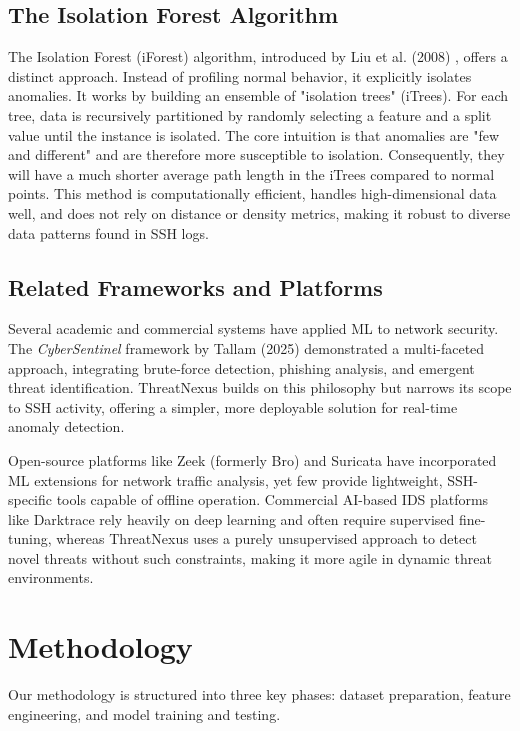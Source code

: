 \documentclass[conference]{IEEEtran}
\begin{document}
\subsection{The Isolation Forest Algorithm}
The Isolation Forest (iForest) algorithm, introduced by Liu et al. (2008) \cite{liu2008isolation}, offers a distinct approach. Instead of profiling normal behavior, it explicitly isolates anomalies. It works by building an ensemble of "isolation trees" (iTrees). For each tree, data is recursively partitioned by randomly selecting a feature and a split value until the instance is isolated. The core intuition is that anomalies are "few and different" and are therefore more susceptible to isolation. Consequently, they will have a much shorter average path length in the iTrees compared to normal points. This method is computationally efficient, handles high-dimensional data well, and does not rely on distance or density metrics, making it robust to diverse data patterns found in SSH logs.

\subsection{Related Frameworks and Platforms}
Several academic and commercial systems have applied ML to network security. The \textit{CyberSentinel} framework by Tallam (2025) \cite{tallam2025cybersentinel} demonstrated a multi-faceted approach, integrating brute-force detection, phishing analysis, and emergent threat identification. ThreatNexus builds on this philosophy but narrows its scope to SSH activity, offering a simpler, more deployable solution for real-time anomaly detection.

Open-source platforms like Zeek (formerly Bro) and Suricata have incorporated ML extensions for network traffic analysis, yet few provide lightweight, SSH-specific tools capable of offline operation. Commercial AI-based IDS platforms like Darktrace rely heavily on deep learning and often require supervised fine-tuning, whereas ThreatNexus uses a purely unsupervised approach to detect novel threats without such constraints, making it more agile in dynamic threat environments.

\section{Methodology}
Our methodology is structured into three key phases: dataset preparation, feature engineering, and model training and testing.
\end{document}
